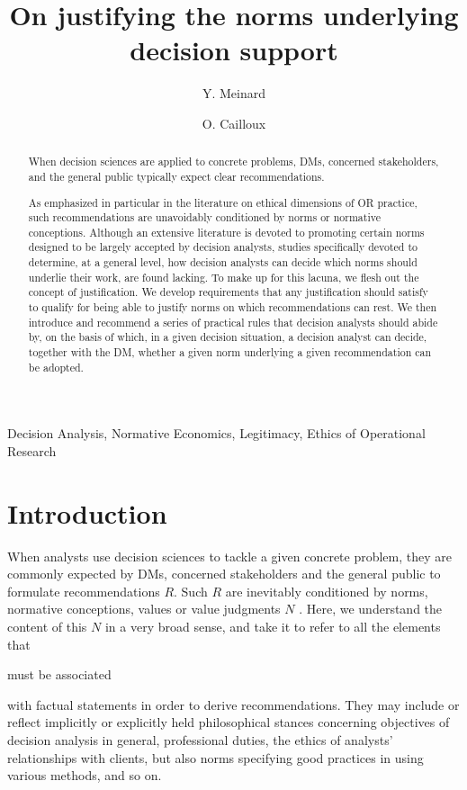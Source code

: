 \documentclass[preprint, french, english, 11pt, authoryear]{elsarticle}%
\begin{document}
\hypersetup{citecolor=black}
\title{On justifying the norms underlying decision support}

\author[ld]{Y. Meinard}
\author[ld]{O. Cailloux}
\address[ld]{Universit\'e Paris-Dauphine, PSL Research University, CNRS, UMR [7243], LAMSADE, 75016 PARIS, FRANCE}

\begin{abstract}
When decision sciences are applied to concrete problems, \acp{DM}, concerned stakeholders, and the general public typically expect clear recommendations.
\begin{changebar}As emphasized in particular in the literature on ethical dimensions of \ac{OR} practice, such recommendations are unavoidably conditioned by norms or normative conceptions.
Although an extensive literature is devoted to promoting certain norms designed to be largely accepted by decision analysts, studies specifically devoted to determine, at a general level, how decision analysts can decide which norms should underlie their work, are found lacking.
To make up for this lacuna, we flesh out the concept of justification. 
We develop requirements that any justification should satisfy to qualify for being able to justify norms on which recommendations can rest.
We then introduce and recommend a series of practical rules that decision analysts should abide by, on the basis of which, in a given decision situation, a decision analyst can decide, together with the \ac{DM}, whether a given norm underlying a given recommendation can be adopted.\end{changebar}

\end{abstract}
\acresetall
\begin{keyword}
Decision Analysis, Normative Economics, Legitimacy, Ethics of Operational Research
\end{keyword}

\maketitle

\section{Introduction}
When analysts use decision sciences to tackle a given concrete problem, they are commonly expected by \acp{DM}, concerned stakeholders and the general public to formulate recommendations $R$. 
Such $R$ are inevitably conditioned by norms, normative conceptions, values or value judgments $N$ \citep{funtowicz_science_1993,brans_ethics_2002,mingers_ethics_2011}.
Here, we understand the content of this $N$ in a very broad sense, and take it to refer to all the elements that \begin{changebar} must be associated \end{changebar}with factual statements in order to derive recommendations. 
They may include or reflect implicitly or explicitly held philosophical stances concerning objectives of decision analysis in general, professional duties, the ethics of analysts' relationships with clients, but also norms specifying good practices in using various methods, and so on.
\end{document}

